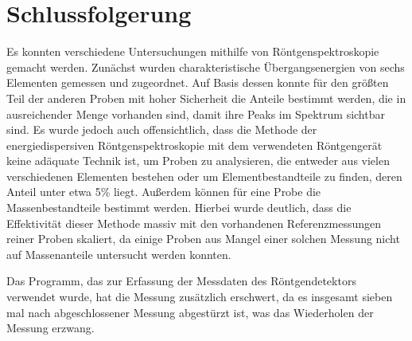 \documentclass[
	a4paper,
	12pt,
	pagesize,
	ngerman
]{scrartcl}
\begin{document}
	\section{Schlussfolgerung}
	Es konnten verschiedene Untersuchungen mithilfe von Röntgenspektroskopie gemacht werden.
	Zunächst wurden charakteristische Übergangsenergien von sechs Elementen gemessen und zugeordnet.
	Auf Basis dessen konnte für den größten Teil der anderen Proben mit hoher Sicherheit die Anteile bestimmt werden, die in ausreichender Menge vorhanden sind, damit ihre Peaks im Spektrum sichtbar sind.
	Es wurde jedoch auch offensichtlich, dass die Methode der energiedispersiven Röntgenspektroskopie mit dem verwendeten Röntgengerät keine adäquate Technik ist, um Proben zu analysieren, die entweder aus vielen verschiedenen Elementen bestehen oder um Elementbestandteile zu finden, deren Anteil unter etwa 5\% liegt. %
	Außerdem können für eine Probe die Massenbestandteile bestimmt werden.
	Hierbei wurde deutlich, dass die Effektivität dieser Methode massiv mit den vorhandenen Referenzmessungen reiner Proben skaliert, da einige Proben aus Mangel einer solchen Messung nicht auf Massenanteile untersucht werden konnten.
	
	Das Programm, das zur Erfassung der Messdaten des Röntgendetektors verwendet wurde, hat die Messung zusätzlich erschwert, da es insgesamt sieben mal nach abgeschlossener Messung abgestürzt ist, was das Wiederholen der Messung erzwang. %
	
	
	
	\printbibliography
\end{document}
